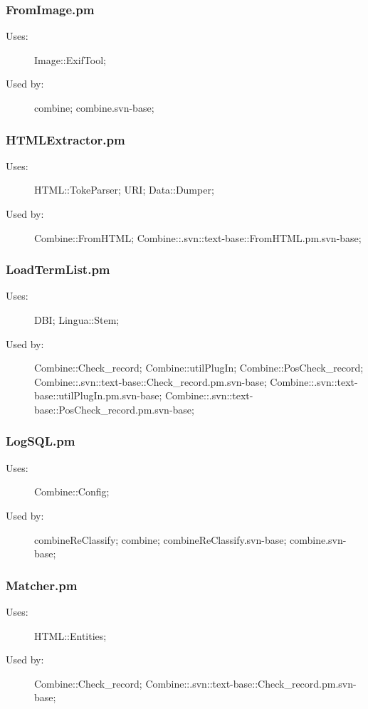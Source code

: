 \subsubsection{FromImage.pm}
\begin{description}
\item[Uses:] Image::ExifTool; 

\item[Used by:] combine; combine.svn-base; 

\end{description}
\subsubsection{HTMLExtractor.pm}
\begin{description}
\item[Uses:] HTML::TokeParser; URI; Data::Dumper; 

\item[Used by:] Combine::FromHTML; Combine::.svn::text-base::FromHTML.pm.svn-base; 

\end{description}
\subsubsection{LoadTermList.pm}
\begin{description}
\item[Uses:] DBI; Lingua::Stem; 

\item[Used by:] Combine::Check\_record; Combine::utilPlugIn; Combine::PosCheck\_record; Combine::.svn::text-base::Check\_record.pm.svn-base; Combine::.svn::text-base::utilPlugIn.pm.svn-base; Combine::.svn::text-base::PosCheck\_record.pm.svn-base; 

\end{description}
\subsubsection{LogSQL.pm}
\begin{description}
\item[Uses:] Combine::Config; 

\item[Used by:] combineReClassify; combine; combineReClassify.svn-base; combine.svn-base; 

\end{description}
\subsubsection{Matcher.pm}
\begin{description}
\item[Uses:] HTML::Entities; 

\item[Used by:] Combine::Check\_record; Combine::.svn::text-base::Check\_record.pm.svn-base; 

\end{description}
